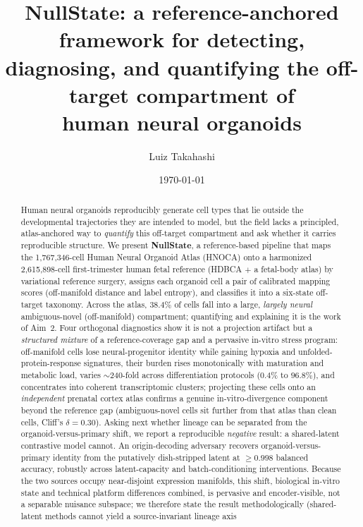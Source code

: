 \documentclass[11pt]{article}
\title{\sffamily\bfseries NullState: a reference-anchored framework for detecting,\\ diagnosing, and quantifying the off-target compartment of\\ human neural organoids}
\author[1]{Luiz Takahashi}
\affil[1]{\normalsize\itshape Voiland College of Engineering and Architecture, Washington State University, Pullman, WA, USA \\ Correspondence: \texttt{l.takahashidosreis@wsu.edu}}
\date{\today}
\newcommand{\nref}{2{,}615{,}898}
\newcommand{\nquery}{1{,}767{,}346}
\begin{document}
\maketitle

\begin{abstract}
\noindent Human neural organoids reproducibly generate cell types that lie outside the developmental
trajectories they are intended to model, but the field lacks a principled, atlas-anchored way to
\emph{quantify} this off-target compartment and ask whether it carries reproducible structure.
We present \textbf{NullState}, a reference-based pipeline that maps the \nquery-cell Human Neural
Organoid Atlas (HNOCA) onto a harmonized \nref-cell first-trimester human fetal reference
(HDBCA $+$ a fetal-body atlas) by variational reference surgery, assigns each organoid cell a pair of
calibrated mapping scores (off-manifold distance and label entropy), and classifies it into a
six-state off-target taxonomy. Across the atlas, $38.4\%$ of cells fall into a large, \emph{largely neural}
ambiguous-novel (off-manifold) compartment; quantifying and explaining it is the work of Aim~2. Four
orthogonal diagnostics show it is not a projection artifact but a \emph{structured mixture} of a
reference-coverage gap and a pervasive in-vitro stress program: off-manifold cells lose
neural-progenitor identity while gaining hypoxia and unfolded-protein-response signatures, their burden
rises monotonically with maturation and metabolic load, varies $\sim$240-fold across differentiation
protocols ($0.4\%$ to $96.8\%$), and concentrates into coherent transcriptomic clusters; projecting
these cells onto an \emph{independent} prenatal cortex atlas confirms a genuine in-vitro-divergence
component beyond the reference gap (ambiguous-novel cells sit further from that atlas than clean cells,
Cliff's $\delta=0.30$). Asking next
whether lineage can be separated from the organoid-versus-primary shift, we report a reproducible
\emph{negative} result: a shared-latent contrastive model cannot. An origin-decoding adversary recovers
organoid-versus-primary identity from the putatively dish-stripped latent at $\geq\!0.998$ balanced
accuracy, robustly across latent-capacity and batch-conditioning interventions. Because the two sources
occupy near-disjoint expression manifolds, this shift, biological in-vitro state and technical platform
differences combined, is pervasive and encoder-visible, not a separable nuisance subspace; we therefore
state the result methodologically (shared-latent methods cannot yield a source-invariant lineage axis

\end{abstract}
\end{document}
